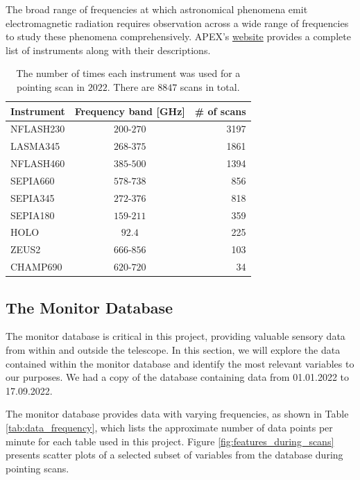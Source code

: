 The broad range of frequencies at which astronomical phenomena emit electromagnetic radiation requires observation across a wide range of frequencies to study these phenomena comprehensively.
APEX's \href{https://www.eso.org/sci/facilities/apex/cfp/cfp110/instrument_summary.html.html}{website} provides a complete list of instruments along with their descriptions.
\begin{table}[H]
    \centering
    \caption[Number of scans for each instrument]{The number of times each instrument was used for a pointing scan in $2022$. There are $8847$ scans in total.}
    \begin{tabular}{lcr}
        \toprule
        Instrument & Frequency band [GHz] &\# of scans \\
        \midrule
        NFLASH230 & $200$-$270$ &3197 \\
        LASMA345  & $268$-$375$ &1861 \\
        NFLASH460 & $385$-$500$ &1394 \\
        SEPIA660  & $578$-$738$ & 856 \\
        SEPIA345  & $272$-$376$ & 818 \\
        SEPIA180  & $159$-$211$ & 359 \\
        HOLO      & $92.4$ & 225 \\
        ZEUS2     & $666$-$856$ & 103 \\
        CHAMP690  & $620$-$720$ &  34 \\
        \bottomrule
        \end{tabular}
        \label{tab:instrument_usage}
\end{table}



\subsection{The Monitor Database}
The monitor database is critical in this project, providing valuable sensory data from within and outside the telescope.
In this section, we will explore the data contained within the monitor database and identify the most relevant variables to our purposes.
We had a copy of the database containing data from 01.01.2022 to 17.09.2022.

The monitor database provides data with varying frequencies, as shown in Table \ref{tab:data_frequency},
which lists the approximate number of data points per minute for each table used in this project.
Figure \ref{fig:features_during_scans} presents scatter plots of a selected subset of variables from the database during pointing scans.  

